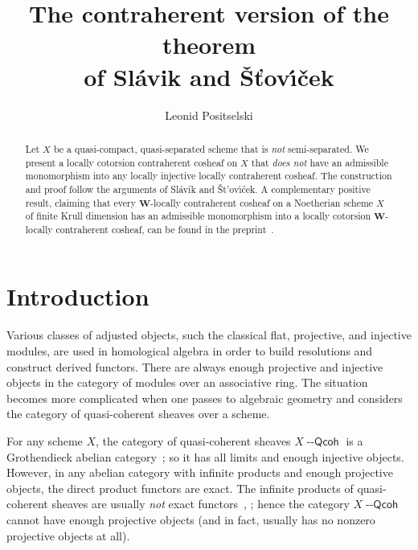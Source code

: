 \documentclass[12pt,a4paper]{amsart}
\newcommand{\+}{\nobreakdash-}
\renewcommand{\:}{\colon}
\newcommand{\Qcoh}{{\operatorname{\mathsf{--Qcoh}}}}
\newcommand{\bW}{\mathbf W}
\theoremstyle{plain}
\theoremstyle{definition}
\begin{document}
\title{The contraherent version of the theorem \\
of Sl\'avik and \v S\v tov\'\i\v cek}

\author{Leonid Positselski}

\address{Institute of Mathematics, Czech Academy of Sciences \\
\v Zitn\'a~25, 115~67 Prague~1 \\ Czech Republic} 


\begin{abstract}
 Let $X$ be a quasi-compact, quasi-separated scheme that is \emph{not}
semi-separated.
 We present a locally cotorsion contraherent cosheaf on $X$ that
\emph{does not} have an admissible monomorphism into any locally
injective locally contraherent cosheaf.
 The construction and proof follow the arguments of Sl\'avik
and \v St\!'ov\'\i\v cek.
 A complementary positive result, claiming that every $\bW$\+locally
contraherent cosheaf on a Noetherian scheme $X$ of finite Krull
dimension has an admissible monomorphism into a locally cotorsion
$\bW$\+locally contraherent cosheaf, can be found in
the preprint~\cite[Section~4.7]{Pform}.
\end{abstract}

\maketitle

\tableofcontents


\section{Introduction}
\medskip

 Various classes of adjusted objects, such the classical flat,
projective, and injective modules, are used in homological algebra
in order to build resolutions and construct derived functors.
 There are always enough projective and injective objects in
the category of modules over an associative ring.
 The situation becomes more complicated when one passes to
algebraic geometry and considers the category of quasi-coherent
sheaves over a scheme.

 For any scheme $X$, the category of quasi-coherent sheaves $X\Qcoh$
is a Grothendieck abelian category~\cite[Section Tag~077K]{SP};
so it has all limits and enough injective objects.
 However, in any abelian category with infinite products and enough
projective objects, the direct product functors are exact.
 The infinite products of quasi-coherent sheaves are usually \emph{not}
exact functors~\cite[Example~4.9]{Kra}, \cite{Kan}; hence the category
$X\Qcoh$ cannot have enough projective objects (and in fact, usually
has no nonzero projective objects at all).  {\par}
\end{document}
